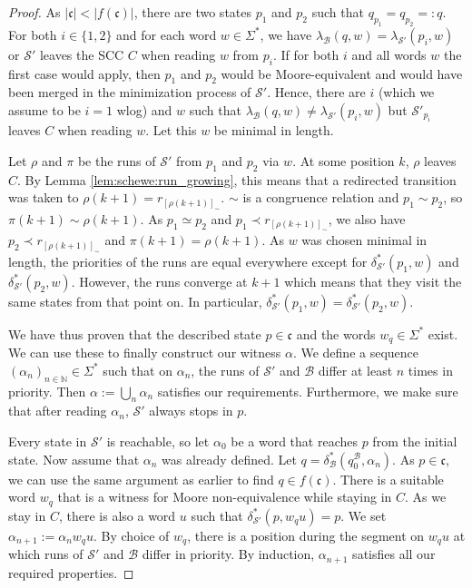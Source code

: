 \begin{proof}
	As $|\mathfrak{c}| < |f(\mathfrak{c})|$, there are two states $p_1$ and $p_2$ such that $q_{p_1} = q_{p_2} =: q$. For both $i \in \{1,2\}$ and for each word $w \in \Sigma^*$, we have $\lambda_\mathcal{B}(q, w) = \lambda_{\mathcal{S}'}(p_i, w)$ or $\mathcal{S}'$ leaves the SCC $C$ when reading $w$ from $p_i$. If for both $i$ and all words $w$ the first case would apply, then $p_1$ and $p_2$ would be Moore-equivalent and would have been merged in the minimization process of $\mathcal{S}'$. Hence, there are $i$ (which we assume to be $i=1$ wlog) and $w$ such that $\lambda_\mathcal{B}(q, w) \neq \lambda_{\mathcal{S}'}(p_i, w)$ but $\mathcal{S}'_{p_i}$ leaves $C$ when reading $w$. Let this $w$ be minimal in length.
	
	Let $\rho$ and $\pi$ be the runs of $\mathcal{S}'$ from $p_1$ and $p_2$ via $w$. At some position $k$, $\rho$ leaves $C$. By Lemma \ref{lem:schewe:run_growing}, this means that a redirected transition was taken to $\rho(k+1) = r_{[\rho(k+1)]_\sim}$. $\sim$ is a congruence relation and $p_1 \sim p_2$, so $\pi(k+1) \sim \rho(k+1)$. As $p_1 \simeq p_2$ and $p_1 \prec r_{[\rho(k+1)]_\sim}$, we also have $p_2 \prec r_{[\rho(k+1)]_\sim}$ and $\pi(k+1) = \rho(k+1)$. As $w$ was chosen minimal in length, the priorities of the runs are equal everywhere except for $\delta^*_{\mathcal{S}'}(p_1, w)$ and $\delta^*_{\mathcal{S}'}(p_2, w)$. However, the runs converge at $k+1$ which means that they visit the same states from that point on. In particular, $\delta^*_{\mathcal{S}'}(p_1, w) = \delta^*_{\mathcal{S}'}(p_2, w)$.
	
	We have thus proven that the described state $p \in \mathfrak{c}$ and the words $w_q \in \Sigma^*$ exist. We can use these to finally construct our witness $\alpha$. We define a sequence $(\alpha_n)_{n \in \mathbb{N}} \in \Sigma^*$ such that on $\alpha_n$, the runs of $\mathcal{S}'$ and $\mathcal{B}$ differ at least $n$ times in priority. Then $\alpha := \bigcup_n \alpha_n$ satisfies our requirements. Furthermore, we make sure that after reading $\alpha_n$, $\mathcal{S}'$ always stops in $p$.
	
	Every state in $\mathcal{S}'$ is reachable, so let $\alpha_0$ be a word that reaches $p$ from the initial state. Now assume that $\alpha_n$ was already defined. Let $q = \delta^*_\mathcal{B}(q_0^\mathcal{B}, \alpha_n)$. As $p \in \mathfrak{c}$, we can use the same argument as earlier to find $q \in f(\mathfrak{c})$. There is a suitable word $w_q$ that is a witness for Moore non-equivalence while staying in $C$. As we stay in $C$, there is also a word $u$ such that $\delta^*_{\mathcal{S}'}(p, w_q u) = p$. We set $\alpha_{n+1} := \alpha_n w_q u$. By choice of $w_q$, there is a position during the segment on $w_q u$ at which runs of $\mathcal{S}'$ and $\mathcal{B}$ differ in priority. By induction, $\alpha_{n+1}$ satisfies all our required properties.
\end{proof}


